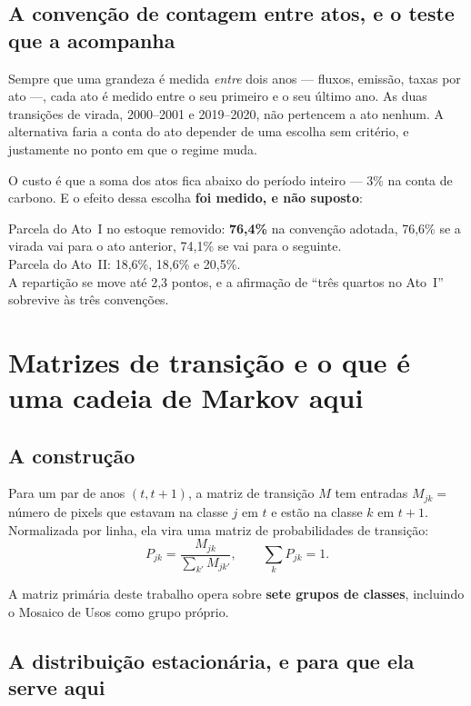 \section{A convenção de contagem entre atos, e o teste que a acompanha}

Sempre que uma grandeza é medida \emph{entre} dois anos --- fluxos, emissão,
taxas por ato ---, cada ato é medido entre o seu primeiro e o seu último ano.
As duas transições de virada, 2000--2001 e 2019--2020, não pertencem a ato
nenhum. A alternativa faria a conta do ato depender de uma escolha sem
critério, e justamente no ponto em que o regime muda.

O custo é que a soma dos atos fica abaixo do período inteiro --- 3\% na conta de
carbono. E o efeito dessa escolha \textbf{foi medido, e não suposto}:

\begin{ancora}
Parcela do Ato~I no estoque removido: \textbf{76,4\%} na convenção adotada,
76,6\% se a virada vai para o ato anterior, 74,1\% se vai para o seguinte. \\
Parcela do Ato~II: 18,6\%, 18,6\% e 20,5\%. \\
A repartição se move até 2,3 pontos, e a afirmação de ``três quartos no Ato~I''
sobrevive às três convenções.
\end{ancora}

\chapter{Matrizes de transição e o que é uma cadeia de Markov aqui}
\label{cap:markov}

\section{A construção}

Para um par de anos $(t, t+1)$, a matriz de transição $M$ tem entradas
$M_{jk} = $ número de pixels que estavam na classe $j$ em $t$ e estão na classe
$k$ em $t+1$. Normalizada por linha, ela vira uma matriz de probabilidades de
transição:
\begin{equation}
P_{jk} = \frac{M_{jk}}{\sum_{k'} M_{jk'}},
\qquad \sum_k P_{jk} = 1.
\end{equation}

A matriz primária deste trabalho opera sobre \textbf{sete grupos de classes},
incluindo o Mosaico de Usos como grupo próprio.

\section{A distribuição estacionária, e para que ela serve aqui}

